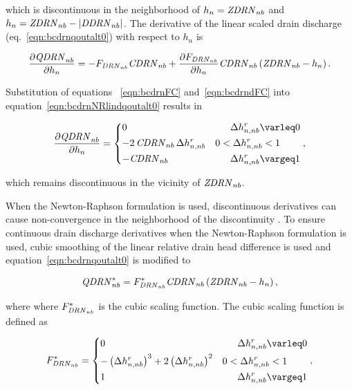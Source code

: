 \noindent which is discontinuous in the neighborhood of $h_n = \mathit{ZDRN}_{nb}$ and $h_n = \mathit{ZDRN}_{nb} - \left| \mathit{DDRN}_{nb} \right| $. The derivative of the linear scaled drain discharge (eq.~\ref{eqn:bcdrnqoutalt0}) with respect to $h_n$ is

\begin{equation}
	\label{eqn:bcdrnNRlindqoutalt0}
	\frac{\partial \mathit{QDRN}_{nb}}{\partial h_n} = -F_{\mathit{DRN}_{nb}} \mathit{CDRN}_{nb}  + \frac{\partial F_{\mathit{DRN}_{nb}}}{\partial h_n} \mathit{CDRN}_{nb} \left( \mathit{ZDRN}_{nb} - h_{n} \right) .
\end{equation}

\noindent Substitution of equations ~\ref{eqn:bcdrnFC} and~\ref{eqn:bcdrndFC} into equation~\ref{eqn:bcdrnNRlindqoutalt0} results in

\begin{equation}
	\begin{aligned}
		\label{eqn:bcdrnNRlindQdh}
		\frac{\partial \mli{QDRN}_{nb}}{\partial h_n} = \begin{dcases} 
			0 &\phantom{0 <} \Delta h_{n,nb}^{r} \le 0 \\
			- 2\, \mli{CDRN}_{nb} \, \Delta h_{n,nb}^{r}  &0 < \Delta h_{n,nb}^{r} < 1 \\
			-\mli{CDRN}_{nb} &\phantom{0 <} \Delta h_{n,nb}^{r} \ge 1
		\end{dcases} ,
	\end{aligned}
\end{equation}

\noindent which remains discontinuous in the vicinity of $\mathit{ZDRN}_{nb}$.

When the Newton-Raphson formulation is used, discontinuous derivatives can cause non-convergence in the neighborhood of the discontinuity \citep{doi:10.1029/2006WR005195}. To ensure continuous drain discharge derivatives when the Newton-Raphson formulation is used, cubic smoothing of the linear relative drain head difference is used and equation~\ref{eqn:bcdrnqoutalt0} is modified to

\begin{equation}
	\label{eqn:bcdrnNRqoutalt0}
	\mathit{QDRN}_{nb}^* = F_{\mathit{DRN}_{nb}}^* \mathit{CDRN}_{nb} \left( \mathit{ZDRN}_{nb} - h_{n} \right) ,
\end{equation}

\noindent where where $F_{\mathit{DRN}_{nb}}^*$ is the cubic scaling function. The cubic scaling function is defined as

\begin{equation}
	\begin{aligned}
		\label{eqn:bcdrnFCC}
		F_{\mli{DRN}_{nb}}^* = \begin{dcases} 
			0 & \phantom{0 <} \Delta h_{n,nb}^{r} \le 0 \\
			- \left( \Delta h_{n,nb}^{r} \right)^3  + 2 \left( \Delta h_{n,nb}^{r} \right)^2  & 0 < \Delta h_{n,nb}^{r} < 1 \\
			1 & \phantom{0 <} \Delta h_{n,nb}^{r} \ge 1
		\end{dcases} ,
	\end{aligned}
\end{equation}

